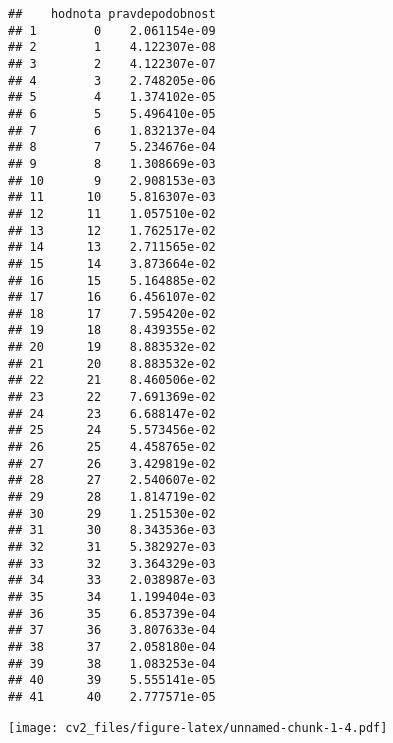 \documentclass[
]{article}
\newenvironment{Shaded}{\begin{snugshade}}{\end{snugshade}}
\newcommand{\AttributeTok}[1]{\textcolor[rgb]{0.77,0.63,0.00}{#1}}
\newcommand{\DecValTok}[1]{\textcolor[rgb]{0.00,0.00,0.81}{#1}}
\newcommand{\FloatTok}[1]{\textcolor[rgb]{0.00,0.00,0.81}{#1}}
\newcommand{\FunctionTok}[1]{\textcolor[rgb]{0.00,0.00,0.00}{#1}}
\newcommand{\NormalTok}[1]{#1}
\newcommand{\SpecialCharTok}[1]{\textcolor[rgb]{0.00,0.00,0.00}{#1}}
\newcommand{\StringTok}[1]{\textcolor[rgb]{0.31,0.60,0.02}{#1}}
\begin{document}
\begin{verbatim}
##    hodnota pravdepodobnost
## 1        0    2.061154e-09
## 2        1    4.122307e-08
## 3        2    4.122307e-07
## 4        3    2.748205e-06
## 5        4    1.374102e-05
## 6        5    5.496410e-05
## 7        6    1.832137e-04
## 8        7    5.234676e-04
## 9        8    1.308669e-03
## 10       9    2.908153e-03
## 11      10    5.816307e-03
## 12      11    1.057510e-02
## 13      12    1.762517e-02
## 14      13    2.711565e-02
## 15      14    3.873664e-02
## 16      15    5.164885e-02
## 17      16    6.456107e-02
## 18      17    7.595420e-02
## 19      18    8.439355e-02
## 20      19    8.883532e-02
## 21      20    8.883532e-02
## 22      21    8.460506e-02
## 23      22    7.691369e-02
## 24      23    6.688147e-02
## 25      24    5.573456e-02
## 26      25    4.458765e-02
## 27      26    3.429819e-02
## 28      27    2.540607e-02
## 29      28    1.814719e-02
## 30      29    1.251530e-02
## 31      30    8.343536e-03
## 32      31    5.382927e-03
## 33      32    3.364329e-03
## 34      33    2.038987e-03
## 35      34    1.199404e-03
## 36      35    6.853739e-04
## 37      36    3.807633e-04
## 38      37    2.058180e-04
## 39      38    1.083253e-04
## 40      39    5.555141e-05
## 41      40    2.777571e-05
\end{verbatim}

\begin{Shaded}
\end{Shaded}

\texttt{[image: cv2\_files/figure-latex/unnamed-chunk-1-4.pdf]}
\end{document}
